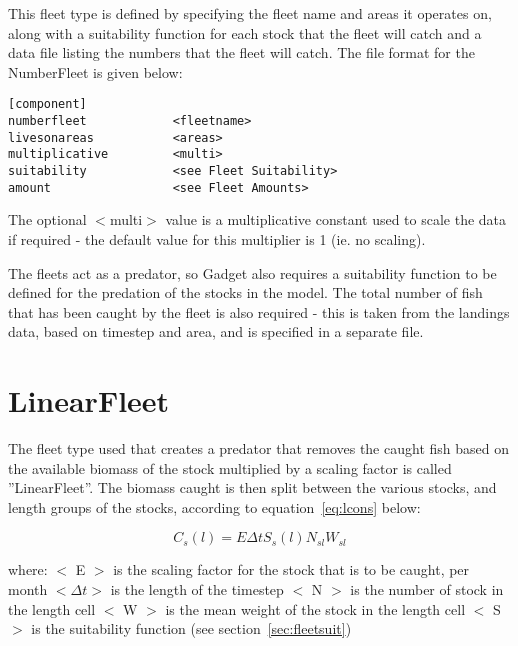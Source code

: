 \documentclass[10pt,twoside]{book}
\begin{document}
\bigskip
This fleet type is defined by specifying the fleet name and areas it operates on, along with a suitability function for each stock that the fleet will catch and a data file listing the numbers that the fleet will catch.  The file format for the NumberFleet is given below:

{\small\begin{verbatim}
[component]
numberfleet            <fleetname>
livesonareas           <areas>
multiplicative         <multi>
suitability            <see Fleet Suitability>
amount                 <see Fleet Amounts>
\end{verbatim}}

The optional $<$multi$>$ value is a multiplicative constant used to scale the data if required - the default value for this multiplier is 1 (ie. no scaling).

\bigskip
The fleets act as a predator, so Gadget also requires a suitability function to be defined for the predation of the stocks in the model.  The total number of fish that has been caught by the fleet is also required - this is taken from the landings data, based on timestep and area, and is specified in a separate file.

\section{LinearFleet}\label{sec:linearfleet}
The fleet type used that creates a predator that removes the caught fish based on the available biomass of the stock multiplied by a scaling factor is called ''LinearFleet''.  The biomass caught is then split between the various stocks, and length groups of the stocks, according to equation~\ref{eq:lcons} below:

\begin{equation}\label{eq:lcons}
C_{s}(l) = E \Delta t S_{s}(l) N_{sl} W_{sl}
\end{equation}

where:\newline
$<$ E $>$ is the scaling factor for the stock that is to be caught, per month\newline
$<\Delta t>$ is the length of the timestep\newline
$<$ N $>$ is the number of stock in the length cell\newline
$<$ W $>$ is the mean weight of the stock in the length cell\newline
$<$ S $>$ is the suitability function (see section~\ref{sec:fleetsuit})
\end{document}
